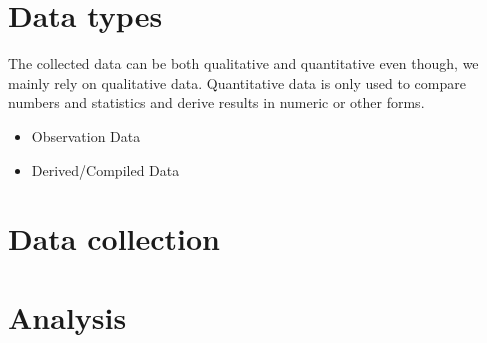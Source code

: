 \documentclass[]{report}
\begin{document}
\section{Data types}
The collected data can be both qualitative and quantitative even though, we mainly rely on qualitative data.
Quantitative data is only used to compare numbers and statistics and derive results in numeric or other forms.
\begin{itemize}
	\item Observation Data
	\item Derived/Compiled Data
\end{itemize}
\section{Data collection}
\section{Analysis}
\end{document}
